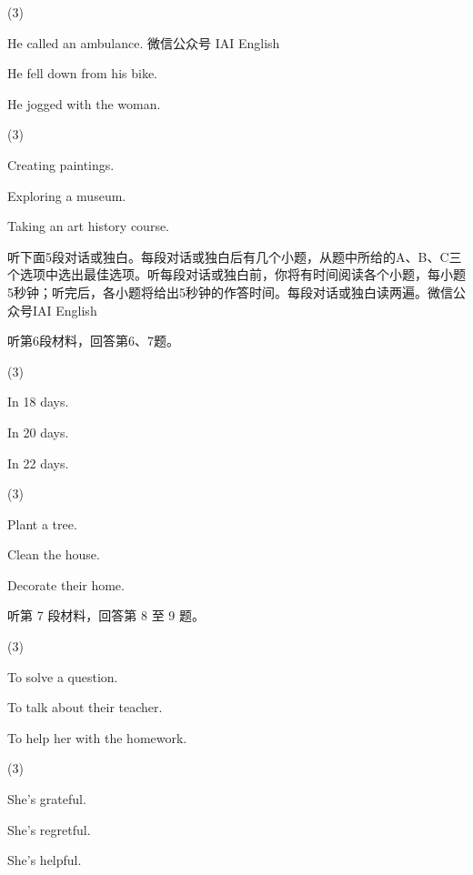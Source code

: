 \documentclass{英语试卷}
\begin{document}
\begin{choices}(3)
  \item He called an ambulance. 微信公众号 IAI English
  \item He fell down from his bike.
  \item He jogged with the woman.
\end{choices}
\begin{choices}(3)
  \item Creating paintings.
  \item Exploring a museum.
  \item Taking an art history course.
\end{choices}
\par 听下面5段对话或独白。每段对话或独白后有几个小题，从题中所给的A、B、C三个选项中选出最佳选项。听每段对话或独白前，你将有时间阅读各个小题，每小题5秒钟；听完后，各小题将给出5秒钟的作答时间。每段对话或独白读两遍。微信公众号IAI English\par
\par 听第6段材料，回答第6、7题。\par
{}
\begin{choices}(3)
  \item In 18 days.
  \item In 20 days.
  \item In 22 days.
\end{choices}
\begin{choices}(3)
  \item Plant a tree.
  \item Clean the house.
  \item Decorate their home.
\end{choices}
\par 听第 7 段材料，回答第 8 至 9 题。\par
{}
\begin{choices}(3)
  \item To solve a question.
  \item To talk about their teacher.
  \item To help her with the homework.
\end{choices}
\begin{choices}(3)
  \item She's grateful.
  \item She's regretful.
  \item She's helpful.
\end{choices}
\end{document}
